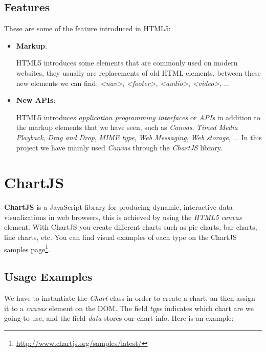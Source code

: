 \documentclass[a4paper, 12pt, english]{book}
\begin{document}
\subsection{Features}
\label{sec:html5-features}
These are some of the feature introduced in HTML5:
\begin{itemize}
    \item \textbf{Markup}:

        HTML5 introduces some elements that are commonly used on modern websites, they usually are replacements of old HTML elements, between these new elements we can find: \textit{<nav>}, \textit{<footer>}, \textit{<audio>}, \textit{<video>}, ...
    \item \textbf{New APIs}:

        HTML5 introduces \textit{application programming interfaces} or \textit{APIs} in addition to the markup elements that we have seen, such as \textit{Canvas}, \textit{Timed Media Playback}, \textit{Drag and Drop}, \textit{MIME type}, \textit{Web Messaging}, \textit{Web storage}, ... In this project we have mainly used \textit{Canvas} through the \textit{ChartJS} library.
\end{itemize}


\section{ChartJS}
\label{sec:chartjs}

\textbf{ChartJS} is a JavaScript library for producing dynamic, interactive data visualizations in web browsers, this is achieved by using the \textit{HTML5} \textit{canvas} element. With ChartJS you create different charts such as pie charts, bar charts, line charts, etc. You can find visual examples of each type on the ChartJS samples page\footnote{\url{http://www.chartjs.org/samples/latest/}}.

\subsection{Usage Examples}
\label{sec:chatjs-examples}

We have to instantiate the \textit{Chart} class in order to create a chart, an then assign it to a \textit{canvas} element on the DOM. The field \textit{type} indicates which chart are we going to use, and the field \textit{data} stores our chart info. Here is an example:
\end{document}
